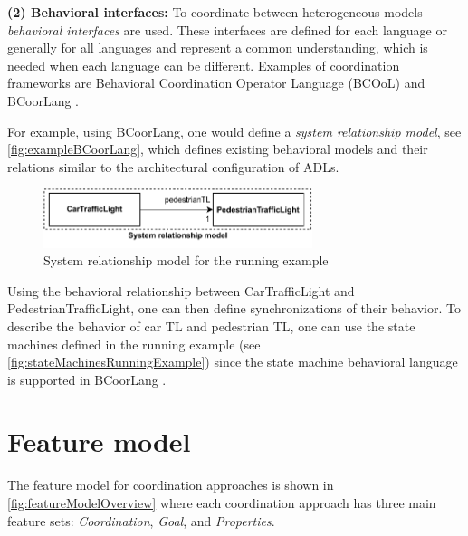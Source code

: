 \documentclass[runningheads]{llncs}
\begin{document}
\textbf{(2) Behavioral interfaces:} To coordinate between heterogeneous models \textit{behavioral interfaces} are used.
These interfaces are defined for each language or generally for all languages and represent a common understanding, which is needed when each language can be different.
Examples of coordination frameworks are Behavioral Coordination Operator Language (BCOoL) \cite{varalarsenBCOolBehavioralCoordination2016,varalarsenBehavioralCoordinationOperator2015} and BCoorLang \cite{krauterBehavioralConsistencyMultimodeling2023}.

For example, using BCoorLang, one would define a \textit{system relationship model}, see \autoref{fig:exampleBCoorLang}, which defines existing behavioral models and their relations similar to the architectural configuration of ADLs.

\begin{figure}[ht]
	\centering
	\includegraphics[width=0.7\textwidth]{images/running_example_BCorrLang}
	\caption{System relationship model for the running example}
	\label{fig:exampleBCoorLang}
\end{figure}

Using the behavioral relationship between \textsf{CarTrafficLight} and \textsf{PedestrianTrafficLight}, one can then define synchronizations of their behavior.
To describe the behavior of car TL and pedestrian TL, one can use the state machines defined in the running example (see \autoref{fig:stateMachinesRunningExample}) since the state machine behavioral language is supported in BCoorLang \cite{krauterBehavioralConsistencyMultimodeling2023}.


\section{Feature model} \label{sec:features}

The feature model for coordination approaches is shown in \autoref{fig:featureModelOverview} where each coordination approach has three main feature sets: \textit{Coordination}, \textit{Goal}, and \textit{Properties}.
\end{document}
